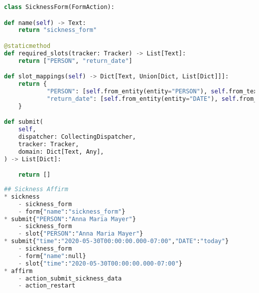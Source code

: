 \begin{lstlisting}[caption={Slot Filling Action}, label={lst:slot_fill_action},captionpos=b,frame=single,language={Python},commentstyle=\color{mygreen},keywordstyle=\color{blue},
    morekeywords={}]                
class SicknessForm(FormAction):

def name(self) -> Text:
    return "sickness_form"

@staticmethod
def required_slots(tracker: Tracker) -> List[Text]:
    return ["PERSON", "return_date"]

def slot_mappings(self) -> Dict[Text, Union[Dict, List[Dict]]]:
    return {
            "PERSON": [self.from_entity(entity="PERSON"), self.from_text()],
            "return_date": [self.from_entity(entity="DATE"), self.from_text()]
    }

def submit(
    self,
    dispatcher: CollectingDispatcher,
    tracker: Tracker,
    domain: Dict[Text, Any],
) -> List[Dict]:

    return []    
\end{lstlisting} 

\begin{lstlisting}[caption={Rasa Sickness Story}, label={lst:rasa_sickness_story},captionpos=b,frame=single,language={Python},commentstyle=\color{mygreen},keywordstyle=\color{blue},
    morekeywords={sickness, submit, affirm}]                
## Sickness Affirm
* sickness
    - sickness_form
    - form{"name":"sickness_form"}
* submit{"PERSON":"Anna Maria Mayer"}
    - sickness_form
    - slot{"PERSON":"Anna Maria Mayer"}
* submit{"time":"2020-05-30T00:00:00.000-07:00","DATE":"today"}
    - sickness_form
    - form{"name":null}
    - slot{"time":"2020-05-30T00:00:00.000-07:00"}
* affirm
    - action_submit_sickness_data
    - action_restart
\end{lstlisting} 


